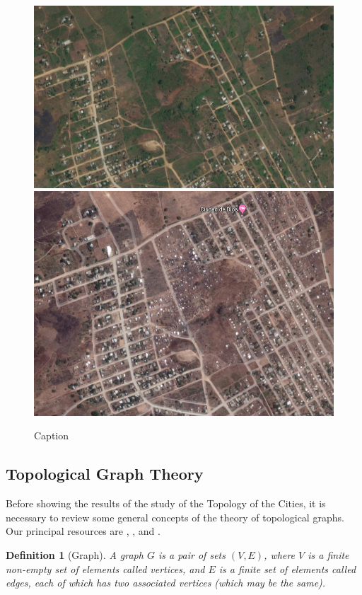 \documentclass[10pt]{article}
\newtheorem{definition}{Definition}
\begin{document}
\begin{figure}[h]
    \centering
    \includegraphics[scale = 0.31]{images/slum2010}
    \includegraphics[scale = 0.22]{images/slum2019}
    \caption{Caption}
    \label{fig:my_label}
\end{figure}
\subsection{Topological Graph Theory}
Before showing the results of the study of the Topology of the Cities, it is necessary to review some general concepts of the theory of topological graphs. Our principal resources are \cite{gross2009topics}, \cite{bonnington2012foundations}, \cite{gross1987topological} and \cite{richeson2008euler}.\\

\begin{definition}[Graph]
A graph $G$ is a pair of sets $(V , E)$, where $V$ is a finite non-empty set of elements called vertices, and $E$ is a finite set of elements called edges, each of which has two associated vertices (which may be the same).
\end{definition}
\end{document}
